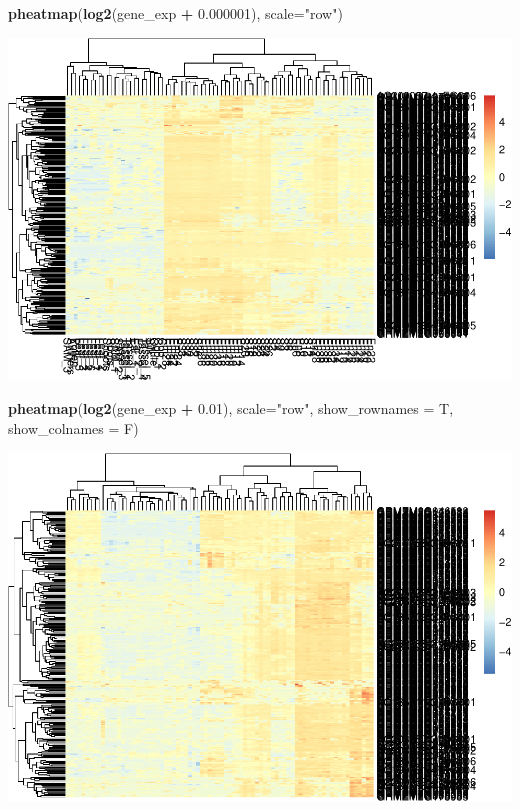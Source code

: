 \documentclass[]{book}
\makeatletter
\newenvironment{Shaded}{\begin{snugshade}}{\end{snugshade}}
\newcommand{\DataTypeTok}[1]{\textcolor[rgb]{0.13,0.29,0.53}{#1}}
\newcommand{\FloatTok}[1]{\textcolor[rgb]{0.00,0.00,0.81}{#1}}
\newcommand{\KeywordTok}[1]{\textcolor[rgb]{0.13,0.29,0.53}{\textbf{#1}}}
\newcommand{\NormalTok}[1]{#1}
\newcommand{\OperatorTok}[1]{\textcolor[rgb]{0.81,0.36,0.00}{\textbf{#1}}}
\newcommand{\StringTok}[1]{\textcolor[rgb]{0.31,0.60,0.02}{#1}}
\newenvironment{kframe}{%
\medskip{}
\setlength{\fboxsep}{.8em}
 \def\at@end@of@kframe{}%
 \ifinner\ifhmode%
  \def\at@end@of@kframe{\end{minipage}}%
  \begin{minipage}{\columnwidth}%
 \fi\fi%
 \def\FrameCommand##1{\hskip\@totalleftmargin \hskip-\fboxsep
 \colorbox{shadecolor}{##1}\hskip-\fboxsep
     \hskip-\linewidth \hskip-\@totalleftmargin \hskip\columnwidth}%
 \MakeFramed {\advance\hsize-\width
   \@totalleftmargin\z@ \linewidth\hsize
   \@setminipage}}%
 {\par\unskip\endMakeFramed%
 \at@end@of@kframe}
\renewenvironment{Shaded}{\begin{kframe}}{\end{kframe}}
\makeatother
\begin{document}
\begin{Shaded}
\begin{Highlighting}[]
\KeywordTok{pheatmap}\NormalTok{(}\KeywordTok{log2}\NormalTok{(gene_exp }\OperatorTok{+}\StringTok{ }\FloatTok{0.000001}\NormalTok{), }\DataTypeTok{scale=}\StringTok{"row"}\NormalTok{)}
\end{Highlighting}
\end{Shaded}

\includegraphics{bioinfBookXIE186_files/figure-latex/unnamed-chunk-95-2.pdf}

\begin{Shaded}
\begin{Highlighting}[]
\KeywordTok{pheatmap}\NormalTok{(}\KeywordTok{log2}\NormalTok{(gene_exp }\OperatorTok{+}\StringTok{ }\FloatTok{0.01}\NormalTok{), }\DataTypeTok{scale=}\StringTok{"row"}\NormalTok{, }\DataTypeTok{show_rownames =}\NormalTok{ T, }\DataTypeTok{show_colnames =}\NormalTok{ F)}
\end{Highlighting}
\end{Shaded}

\includegraphics{bioinfBookXIE186_files/figure-latex/unnamed-chunk-95-3.pdf}
\end{document}
